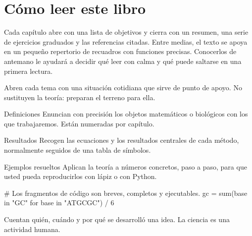 \chapter*{Cómo leer este libro}

Cada capítulo abre con una lista de objetivos y cierra con un resumen, una serie de ejercicios
graduados y las referencias citadas. Entre medias, el texto se apoya en un pequeño repertorio de
recuadros con funciones precisas. Conocerlos de antemano le ayudará a decidir qué leer con calma
y qué puede saltarse en una primera lectura.

\begin{intuicion}
Abren cada tema con una situación cotidiana que sirve de punto de apoyo. No sustituyen la teoría:
preparan el terreno para ella.
\end{intuicion}

\begin{definicion*}{Definiciones}{}
Enuncian con precisión los objetos matemáticos o biológicos con los que trabajaremos. Están
numeradas por capítulo.
\end{definicion*}

\begin{teorema*}{Resultados}{}
Recogen las ecuaciones y los resultados centrales de cada método, normalmente seguidos de una
tabla de símbolos.
\end{teorema*}

\begin{simbolos}
\end{simbolos}

\begin{ejemplo*}{Ejemplos resueltos}{}
Aplican la teoría a números concretos, paso a paso, para que usted pueda reproducirlos con lápiz
o con Python.
\end{ejemplo*}

\begin{codigo}[ejemplo.py]
# Los fragmentos de código son breves, completos y ejecutables.
gc = sum(base in "GC" for base in "ATGCGC") / 6
\end{codigo}

\begin{historia}
Cuentan quién, cuándo y por qué se desarrolló una idea. La ciencia es una actividad humana.
\end{historia}

